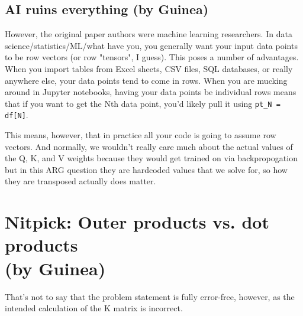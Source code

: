 \documentclass{article}
\begin{document}
\subsection{AI ruins everything \footnotesize{(by Guinea)}}
However, the original paper authors were machine learning researchers.
In data science/statistics/ML/what have you, you generally want your input data points to be row vectors (or row "tensors", I guess).
This poses a number of advantages. When you import tables from Excel sheets, CSV files, SQL databases, or really anywhere else, your data points tend to come in rows.
When you are mucking around in Jupyter notebooks, having your data points be individual rows means that if you want to get the Nth data point, you'd likely pull it using \texttt{pt\_N = df[N]}. 

This means, however, that in practice all your code is going to assume row vectors. 
And normally, we wouldn't really care much about the actual values of the Q, K, and V weights because they would get trained on via backpropogation but in this ARG question they are hardcoded values that we solve for, so how they are transposed actually does matter.



%
%
%
%
%  



\section{Nitpick: Outer products vs. dot products \footnotesize{\\(by Guinea)}}

That's not to say that the problem statement is fully error-free, however, as the intended calculation of the K matrix is incorrect.
\end{document}
